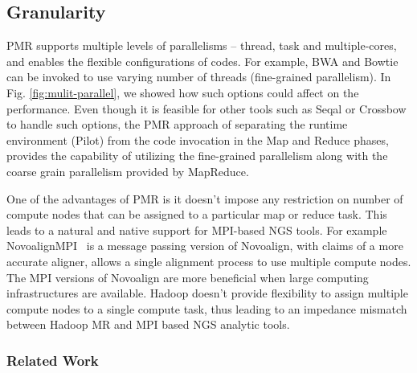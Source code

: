 \documentclass{acm_proc_article-sp}
\begin{document}
\subsection{Granularity} 
PMR supports multiple levels of parallelisms -- thread, task and
multiple-cores, and enables the flexible configurations of codes. For
example, BWA and Bowtie can be invoked to use varying number of
threads (fine-grained parallelism).  In Fig. \ref{fig:mulit-parallel},
we showed how such options could affect on the performance.  Even
though it is feasible for other tools such as Seqal or Crossbow to
handle such options, the PMR approach of separating the runtime
environment (Pilot) from the code invocation in the Map and Reduce
phases, provides the capability of utilizing the fine-grained
parallelism along with the coarse grain parallelism provided by
MapReduce. %

One of the advantages of PMR is it doesn't impose any restriction on
number of compute nodes that can be assigned to a particular map or
reduce task. This leads to a natural and native support for MPI-based
NGS tools. For example NovoalignMPI~\cite{novo-align} is a message
passing version of Novoalign, with claims of a more accurate aligner,
allows a single alignment process to use multiple compute nodes. The
MPI versions of Novoalign are more beneficial when large computing
infrastructures are available. Hadoop doesn't provide flexibility to
assign multiple compute nodes to a single compute task, thus leading
to an impedance mismatch between Hadoop MR and MPI based NGS analytic
tools.


\subsubsection*{Related Work}
\end{document}
